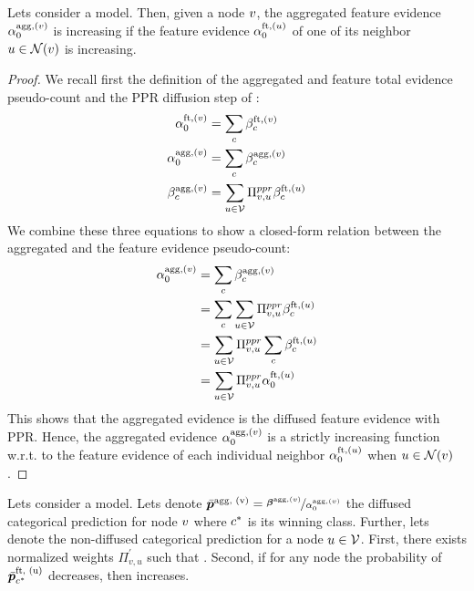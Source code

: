\begin{theorem}
\label{thm:axiom-network-epistemic-proof}
Lets consider a \GPNacro{} model. Then, given a node $v$, the aggregated feature evidence $\alpha_0^{\text{agg}, (v)}$ is increasing if the feature evidence $\alpha_0^{\text{ft}, (u)}$ of one of its neighbor $u \in \mathcal{N}(v)$ is increasing.
\end{theorem}

\begin{proof}
We recall first the definition of the aggregated and feature total evidence pseudo-count and the PPR diffusion step of \GPNacro{}:
\begin{align*}
    \alpha_0^{\text{ft}, (v)} &= \sum_c \beta_c^{\text{ft}, (v)}\\
    \alpha_0^{\text{agg}, (v)} &= \sum_c \beta_c^{\text{agg}, (v)}\\
    \beta_c^{\text{agg}, (v)} &= \sum_{u \in \mathcal{V}} \Pi^{ppr}_{v, u} \beta_c^{\text{ft}, (u)}
\end{align*}
We combine these three equations to show a closed-form relation between the aggregated and the feature evidence pseudo-count:
\begin{align*}
    \alpha_0^{\text{agg}, (v)} &= \sum_c \beta_c^{\text{agg}, (v)}\\
    &= \sum_c \sum_{u \in \mathcal{V}} \Pi^{ppr}_{v, u} \beta_c^{\text{ft}, (u)}\\
    &= \sum_{u \in \mathcal{V}} \Pi^{ppr}_{v, u} \sum_c \beta_c^{\text{ft}, (u)}\\
    &= \sum_{u \in \mathcal{V}} \Pi^{ppr}_{v, u} \alpha_0^{\text{ft}, (u)}
\end{align*}
This shows that the aggregated evidence is the diffused feature evidence with PPR. Hence, the aggregated evidence $\alpha_0^{\text{agg}, (v)}$ is a strictly increasing function w.r.t. to the feature evidence of each individual neighbor $\alpha_0^{\text{ft}, (u)}$ when $u \in \mathcal{N}(v)$.
\end{proof}

\begin{theorem}
\label{thm:axiom-network-aleatoric-proof}
Lets consider a \GPNacro{} model. Lets denote $\bar{\bm{p}}^\text{agg, (v)} = \nicefrac{\bm{\beta}^{\text{agg}, (v)}}{\alpha_0^{\text{agg}, (v)}}$ the diffused categorical prediction for node $v$ where $c^*$ is its winning class. Further, lets denote  the non-diffused categorical prediction for a node $\nodeu \in \vertices$. First, there exists normalized weights $\Pi_{v, u}^{'}$ such that . Second, if for any node \smash{$\nodeu \in \vertices$} the probability of $\bar{\bm{p}}_{c^*}^\text{ft, (u)}$ decreases, then  increases.
\end{theorem}

